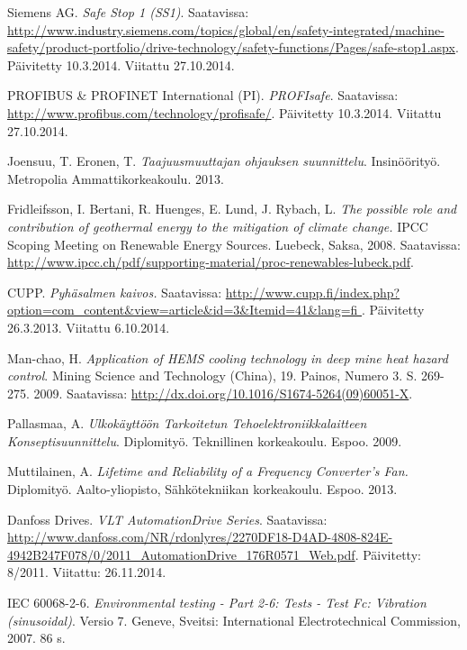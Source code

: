\documentclass[finnish,12pt,a4paper,pdftex,elec,utf8]{aaltothesis}
\begin{document}
\begin{thebibliography}{99}
Siemens AG. \textit{Safe Stop 1 (SS1)}. Saatavissa: \url{http://www.industry.siemens.com/topics/global/en/safety-integrated/machine-safety/product-portfolio/drive-technology/safety-functions/Pages/safe-stop1.aspx}. Päivitetty 10.3.2014. Viitattu 27.10.2014.

 PROFIBUS \& PROFINET International (PI). \textit{PROFIsafe}. Saatavissa: \url{http://www.profibus.com/technology/profisafe/}. Päivitetty 10.3.2014. Viitattu 27.10.2014.

Joensuu, T. Eronen, T. \textit{Taajuusmuuttajan ohjauksen suunnittelu}. Insinöörityö. Metropolia Ammattikorkeakoulu. 2013.%

Fridleifsson, I. Bertani, R. Huenges, E. Lund, J. Rybach, L. \textit{The possible role and contribution of geothermal energy to the mitigation of climate change.} IPCC Scoping Meeting on Renewable Energy Sources. Luebeck, Saksa, 2008. Saatavissa: \url{http://www.ipcc.ch/pdf/supporting-material/proc-renewables-lubeck.pdf}.

CUPP. \textit{Pyhäsalmen kaivos.} Saatavissa: \url{http://www.cupp.fi/index.php?option=com_content&view=article&id=3&Itemid=41&lang=fi	}. Päivitetty 26.3.2013. Viitattu 6.10.2014.

Man-chao, H. \textit{Application of HEMS cooling technology in deep mine heat hazard control}. Mining Science and Technology (China), 19. Painos, Numero 3. S. 269-275. 2009. Saatavissa: \url{http://dx.doi.org/10.1016/S1674-5264(09)60051-X}.

Pallasmaa, A. \textit{Ulkokäyttöön Tarkoitetun Tehoelektroniikkalaitteen Konseptisuunnittelu}. Diplomityö. Teknillinen korkeakoulu. Espoo. 2009.

Muttilainen, A. \textit{Lifetime and Reliability of a Frequency Converter’s Fan.} Diplomityö. Aalto-yliopisto, Sähkötekniikan korkeakoulu. Espoo. 2013.

Danfoss Drives. \textit{VLT AutomationDrive Series}. Saatavissa: \url{http://www.danfoss.com/NR/rdonlyres/2270DF18-D4AD-4808-824E-4942B247F078/0/2011_AutomationDrive_176R0571_Web.pdf}. Päivitetty: 8/2011. Viitattu: 26.11.2014.

IEC 60068-2-6. \textit{Environmental testing - Part 2-6: Tests - Test Fc: Vibration (sinusoidal)}. Versio 7. Geneve, Sveitsi: International Electrotechnical Commission, 2007. 86 s.


\end{thebibliography}
\end{document}
